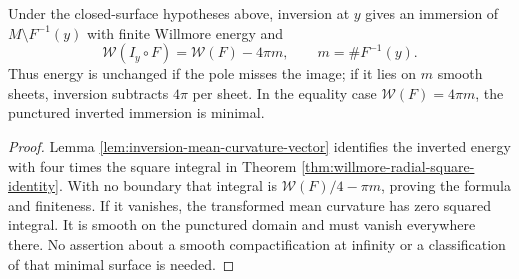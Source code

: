 \begin{proposition}\label{prop:willmore-inversion-energy-defect}
Under the closed-surface hypotheses above, inversion at $y$ gives an immersion of $M\setminus F^{-1}(y)$ with finite Willmore energy and
\[
 \mathcal W(I_y\circ F)=\mathcal W(F)-4\pi m,
 \qquad m=\#F^{-1}(y).
\]
Thus energy is unchanged if the pole misses the image; if it lies on $m$ smooth sheets, inversion subtracts $4\pi$ per sheet. In the equality case $\mathcal W(F)=4\pi m$, the punctured inverted immersion is minimal.
\end{proposition}
\begin{proof}
Lemma \ref{lem:inversion-mean-curvature-vector} identifies the inverted energy with four times the square integral in Theorem \ref{thm:willmore-radial-square-identity}. With no boundary that integral is $\mathcal W(F)/4-\pi m$, proving the formula and finiteness. If it vanishes, the transformed mean curvature has zero squared integral. It is smooth on the punctured domain and must vanish everywhere there. No assertion about a smooth compactification at infinity or a classification of that minimal surface is needed.
\end{proof}

